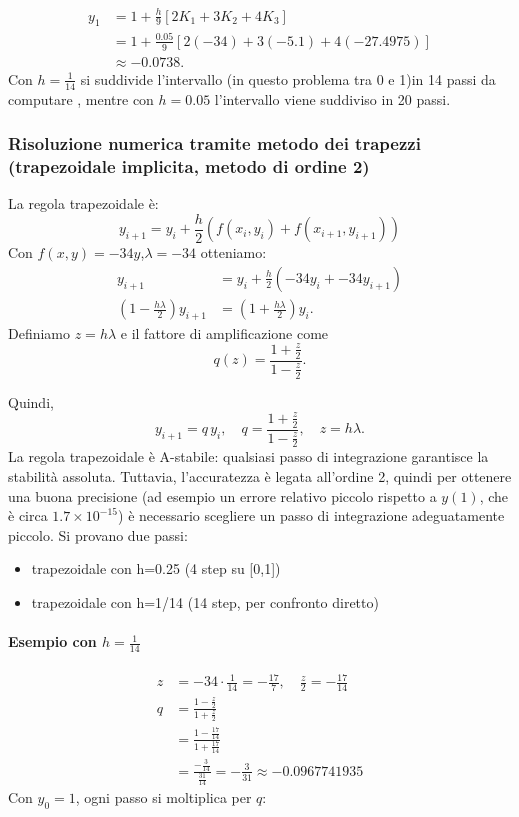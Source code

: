 \documentclass[11pt]{article}
\begin{document}
\begin{align}
	y_1 &= 1 + \frac{h}{9} \left[ 2 K_1 + 3 K_2 + 4 K_3 \right] \\
&= 1 + \frac{0.05}{9} \left[ 2(-34) + 3(-5.1) + 4(-27.4975) \right]\\ 
&\approx -0.0738.
\end{align}
Con $h=\frac{1}{14}$ si suddivide l'intervallo (in questo problema tra 0 e 1)in 14 passi da computare , mentre con $h=0.05$ l'intervallo viene suddiviso in 20 passi.
\subsubsection{Risoluzione numerica tramite metodo dei trapezzi (trapezoidale implicita, metodo di ordine 2)}
La regola trapezoidale è:
\[
y_{i+1}=y_i+\frac{h}{2}(f(x_i,y_i)+f(x_{i+1},y_{i+1}))
\]
Con $f(x,y)=-34y$,$\lambda=-34$ otteniamo:
\begin{align}
	y_{i+1}&=y_i+\frac{h}{2}(-34y_i+-34y_{i+1})\\
	(1 - \frac{h \lambda}{2}) y_{i+1} &= (1 + \frac{h \lambda}{2}) y_i.
\end{align}
Definiamo $z = h \lambda$ e il fattore di amplificazione come
\[
q(z) = \frac{1 + \frac{z}{2}}{1 - \frac{z}{2}}.
\]

Quindi,
\[
y_{i+1} = q \, y_i,
\quad
q = \frac{1 + \frac{z}{2}}{1 - \frac{z}{2}},
\quad
z = h \lambda.
\]
La regola trapezoidale è A-stabile: qualsiasi passo di integrazione garantisce la stabilità assoluta. Tuttavia, l’accuratezza è legata all’ordine 2, quindi per ottenere una buona precisione (ad esempio un errore relativo piccolo rispetto a \( y(1) \), che è circa \( 1.7 \times 10^{-15} \)) è necessario scegliere un passo di integrazione adeguatamente piccolo.
Si provano due passi:
\begin{itemize}
	\item trapezoidale con h=0.25 (4 step su [0,1])
	\item trapezoidale con h=1/14 (14 step, per confronto diretto)
\end{itemize}
\paragraph{Esempio con $h=\frac{1}{14}$}
\begin{align}
	z&=-34\cdot\frac{1}{14}=-\frac{17}{7}, \quad \frac{z}{2}=-\frac{17}{14}\\
	q &= \frac{1 - \frac{z}{2}}{1 + \frac{z}{2}}\\ 
&= \frac{1 - \frac{17}{14}}{1 + \frac{17}{14}}\\ 
&= \frac{-\frac{3}{14}}{\frac{31}{14}}
= -\frac{3}{31} 
\approx -0.0967741935
\end{align}
Con \( y_0 = 1 \), ogni passo si moltiplica per \( q \):
\end{document}

